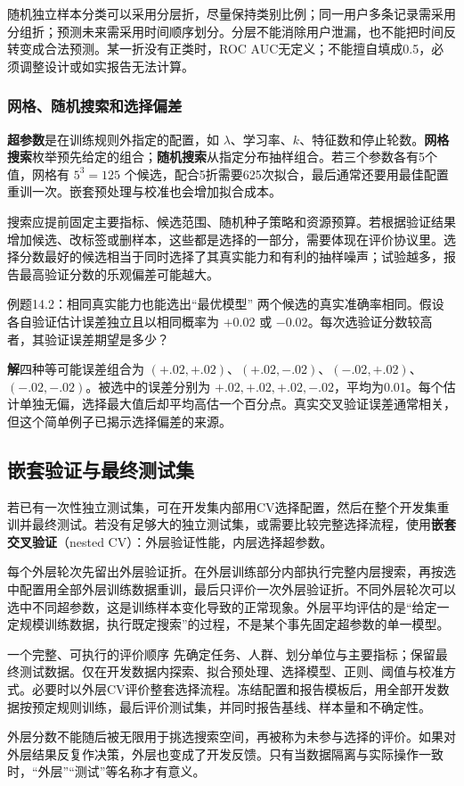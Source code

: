\documentclass[UTF8,fontset=none,zihao=-4,a4paper]{ctexart}
\newcommand{\term}[1]{\textbf{#1}}
\newcommand{\sol}{\par\noindent\textbf{解}\quad}
\numberwithin{equation}{section}
\numberwithin{figure}{section}
\begin{document}
随机独立样本分类可以采用分层折，尽量保持类别比例；同一用户多条记录需采用分组折；预测未来需采用时间顺序划分。分层不能消除用户泄漏，也不能把时间反转变成合法预测。某一折没有正类时，ROC AUC无定义；不能擅自填成0.5，必须调整设计或如实报告无法计算。

\subsubsection{网格、随机搜索和选择偏差}
\term{超参数}是在训练规则外指定的配置，如 $\lambda$、学习率、$k$、特征数和停止轮数。\term{网格搜索}枚举预先给定的组合；\term{随机搜索}从指定分布抽样组合。若三个参数各有5个值，网格有 $5^3=125$ 个候选，配合5折需要625次拟合，最后通常还要用最佳配置重训一次。嵌套预处理与校准也会增加拟合成本。

搜索应提前固定主要指标、候选范围、随机种子策略和资源预算。若根据验证结果增加候选、改标签或删样本，这些都是选择的一部分，需要体现在评价协议里。选择分数最好的候选相当于同时选择了其真实能力和有利的抽样噪声；试验越多，报告最高验证分数的乐观偏差可能越大。

\begin{infobox}[unbreakable]{例题14.2：相同真实能力也能选出“最优模型”}
两个候选的真实准确率相同。假设各自验证估计误差独立且以相同概率为 $+0.02$ 或 $-0.02$。每次选验证分数较高者，其验证误差期望是多少？
\sol 四种等可能误差组合为 $(+.02,+.02)$、$(+.02,-.02)$、$(-.02,+.02)$、$(-.02,-.02)$。被选中的误差分别为 $+.02,+.02,+.02,-.02$，平均为0.01。每个估计单独无偏，选择最大值后却平均高估一个百分点。真实交叉验证误差通常相关，但这个简单例子已揭示选择偏差的来源。
\end{infobox}

\subsection{嵌套验证与最终测试集}
若已有一次性独立测试集，可在开发集内部用CV选择配置，然后在整个开发集重训并最终测试。若没有足够大的独立测试集，或需要比较完整选择流程，使用\term{嵌套交叉验证}（nested CV）：外层验证性能，内层选择超参数。

每个外层轮次先留出外层验证折。在外层训练部分内部执行完整内层搜索，再按选中配置用全部外层训练数据重训，最后只评价一次外层验证折。不同外层轮次可以选中不同超参数，这是训练样本变化导致的正常现象。外层平均评估的是“给定一定规模训练数据，执行既定搜索”的过程，不是某个事先固定超参数的单一模型。

\begin{infobox}{一个完整、可执行的评价顺序}
先确定任务、人群、划分单位与主要指标；保留最终测试数据。仅在开发数据内探索、拟合预处理、选择模型、正则、阈值与校准方式。必要时以外层CV评价整套选择流程。冻结配置和报告模板后，用全部开发数据按预定规则训练，最后评价测试集，并同时报告基线、样本量和不确定性。
\end{infobox}
外层分数不能随后被无限用于挑选搜索空间，再被称为未参与选择的评价。如果对外层结果反复作决策，外层也变成了开发反馈。只有当数据隔离与实际操作一致时，“外层”“测试”等名称才有意义。
\end{document}
